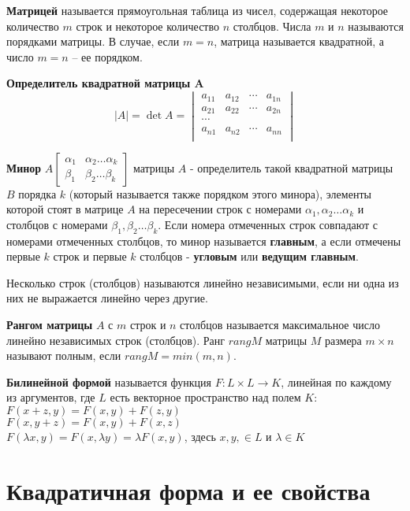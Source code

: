 \documentclass[bachelor, och, coursework, times]{SCWorks}
\newcommand\tab[1][1cm]{\hspace*{#1}}
\begin{document}
\textbf{Матрицей} называется прямоугольная таблица из чисел, содержащая некоторое количество $m$ строк и некоторое количество $n$ столбцов. Числа $m$ и $n$ называются порядками матрицы. В случае, если $m = n$, матрица называется квадратной, а число $m= n$ – ее порядком.

\textbf{Определитель квадратной матрицы A} $$|A|=\det A=\begin{vmatrix}
a_{11} & a_{12} & \cdots & a_{1n} \\ 
a_{21} & a_{22} & \cdots & a_{2n} \\ 
\cdots \\
a_{n1} & a_{n2} & \cdots & a_{nn} \\ 
\end{vmatrix}
$$

\textbf{Минор} $A \begin{bmatrix} \alpha_1 & \alpha_2 \dots \alpha_k \\ \beta_1 & \beta_2 \dots \beta_k \end{bmatrix}$ матрицы $A$ - определитель такой квадратной матрицы $B$ порядка $k$ (который называется также порядком этого минора), элементы которой стоят в матрице $A$ на пересечении строк с номерами $\alpha_1, \alpha_2 \dots \alpha_k$ и столбцов с номерами $\beta_1, \beta_2 \dots \beta_k$.\newline
Если номера отмеченных строк совпадают с номерами отмеченных столбцов, то минор называется \textbf{главным}, а если отмечены первые $k$ строк и первые $k$ столбцов - \textbf{угловым} или \textbf{ведущим главным}.

Несколько строк (столбцов) называются линейно независимыми, если ни одна из них не выражается линейно через другие. 

\textbf{Рангом матрицы} $A$ с $m$ строк и $n$ столбцов называется максимальное число линейно независимых строк (столбцов). Ранг $rangM$ матрицы $M$ размера $m \times n$ называют полным, если $rangM = min(m,n)$.

\textbf{Билинейной формой} называется функция $F:L \times L \to K$, линейная по каждому из аргументов, где $L$ есть векторное пространство над полем $K$: \\
\tab $F(x+z,y)=F(x,y)+F(z,y)$ \\
\tab $F(x,y+z)=F(x,y)+F(x,z)$ \\
\tab $F(\lambda x,y)= F(x,\lambda y) = \lambda F(x,y)$, здесь $x,y,\in L$ и $\lambda \in K$


\section{Квадратичная форма и ее свойства}
\end{document}
